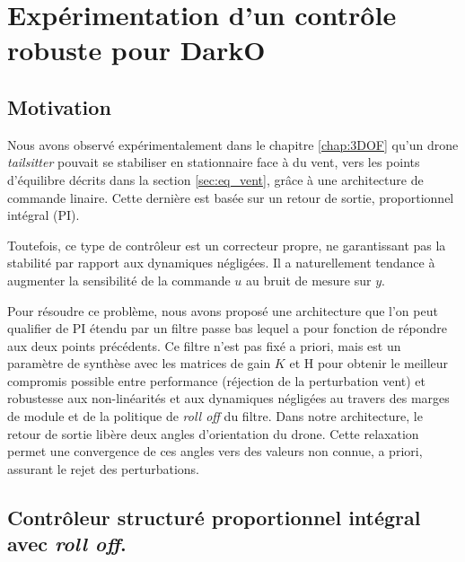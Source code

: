 \chapter{Expérimentation d'un contrôle robuste pour DarkO}

\minitoc
\label{chap:6DOF}

\section{Motivation}
\label{sec:motivation6DOF}
Nous avons observé expérimentalement dans le chapitre \ref{chap:3DOF} qu'un drone \textit{tailsitter} pouvait se stabiliser en stationnaire face à du vent, vers les points d'équilibre décrits dans la section \ref{sec:eq_vent}, grâce à une architecture de commande linaire. Cette dernière est basée sur un retour de sortie, proportionnel intégral (PI).
{ \color{blue} Toutefois, ce type de contrôleur est un correcteur propre, ne garantissant pas la stabilité par rapport aux dynamiques négligées. Il a naturellement tendance à augmenter la sensibilité de la commande $u$ au bruit de mesure sur $y$. 

Pour résoudre ce problème, nous avons proposé une architecture que l'on peut qualifier de PI étendu par un filtre passe bas lequel a pour fonction de répondre aux deux points précédents. Ce filtre n'est pas fixé a priori, mais est un paramètre de synthèse avec les matrices de gain $K$ et H pour obtenir le meilleur compromis possible entre performance (réjection de la perturbation vent) et robustesse aux non-linéarités et aux dynamiques négligées au travers des marges de module et de la politique de \textit{roll off} du filtre. 
Dans notre architecture, le retour de sortie libère deux angles d'orientation du drone. Cette relaxation permet une convergence de ces angles vers des valeurs non connue, a priori, assurant le rejet des perturbations.

}
\section{Contrôleur structuré proportionnel intégral avec \textit{roll off}.}
\label{sec:6dofcmd}
